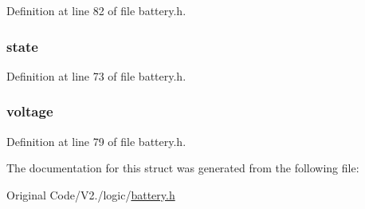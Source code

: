 \-Definition at line 82 of file battery.\-h.

\hypertarget{structbatt_ac6b2518df4ca45cee089e61f152572b2}{
\subsubsection[{state}]{ {\bf state}}}\label{structbatt_ac6b2518df4ca45cee089e61f152572b2}


\-Definition at line 73 of file battery.\-h.

\hypertarget{structbatt_ad769a752524b8ab13170d3e4940686de}{
\subsubsection[{voltage}]{ {\bf voltage}}}\label{structbatt_ad769a752524b8ab13170d3e4940686de}


\-Definition at line 79 of file battery.\-h.



\-The documentation for this struct was generated from the following file\-:\begin{DoxyCompactItemize}
\item 
\-Original Code/\-V2./logic/\hyperlink{battery_8h}{battery.\-h}\end{DoxyCompactItemize}
